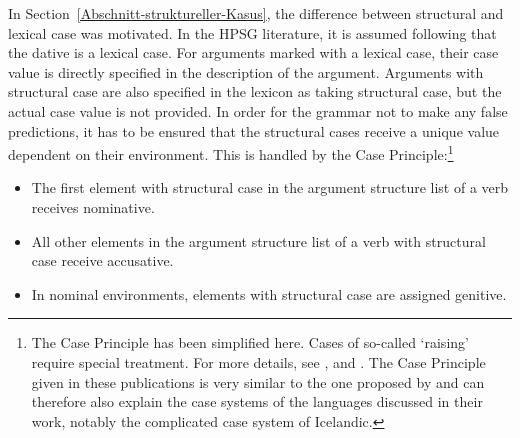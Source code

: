 In Section~\ref{Abschnitt-struktureller-Kasus}, the difference between structural
and lexical case was motivated. In the HPSG literature, it is assumed following \citet{Haider86}
that the dative is a lexical case. For arguments marked with a lexical case, their case value is
directly specified in the description of the argument. Arguments with structural case are also
specified in the lexicon as taking structural case, but the actual case value is not provided. In
order for the grammar not to make any false predictions, it has to be ensured that the structural
cases receive a unique value dependent on their 
environment. This is handled by the Case Principle:\footnote{%
	The Case Principle has been simplified here. Cases of so-called `raising' require special treatment.
	For more details, see ,  and . The Case Principle given in these publications is very similar to
    the one proposed by \citet*{YMJ87} and can therefore also explain the case systems of the
    languages discussed in their work, notably the complicated case system of Icelandic.
}
\begin{principle-break}
\label{case-p}
\begin{itemize}
\item The first element with structural case in the argument structure list of a verb receives nominative.
\item All other elements in the argument structure list of a verb with structural case receive accusative.
\item In nominal environments, elements with structural case are assigned genitive.
\end{itemize}
\end{principle-break}

